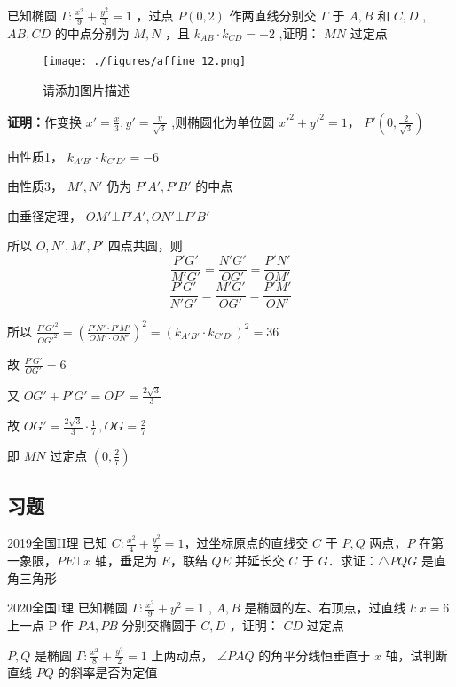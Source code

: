 \begin{example}{}
 已知椭圆 $\displaystyle{\Gamma:\frac{x^2}{9}+\frac{y^2}{3}=1}$ ，过点 $\displaystyle{P(0,2)}$ 作两直线分别交 $\displaystyle{\Gamma}$ 于 $\displaystyle{A,B}$ 和 $\displaystyle{C,D}$ , $\displaystyle{AB,CD}$ 的中点分别为 $\displaystyle{M,N}$ ，且 $\displaystyle{k_{AB}\cdot k_{CD}=-2}$ ,证明： $\displaystyle{MN}$ 过定点
\begin{figure}[ht]
\centering
\texttt{[image: ./figures/affine\_12.png]}
\caption{请添加图片描述} \label{affine_fig12}
\end{figure}
\textbf{证明：}作变换 $\displaystyle{x'=\frac{x}{3},y'=\frac{y}{\sqrt{3}}}$ ,则椭圆化为单位圆 $\displaystyle{x'^2+y'^2=1}$， $\displaystyle{P'\left(0,\frac{2}{\sqrt{3}}\right)}$

由性质1， $\displaystyle{k_{A'B'}\cdot k_{C'D'}=-6}$

由性质3， $\displaystyle{M',N'}$ 仍为 $\displaystyle{P'A',P'B'}$ 的中点

由垂径定理， $\displaystyle{OM'\bot P'A',ON'\bot P'B'}$

所以 $\displaystyle{O,N',M',P'}$ 四点共圆，则 
$$\frac{P'G'}{M'G'}=\frac{N'G'}{OG'}=\frac{P'N'}{OM'}$$
$$\frac{P'G'}{N'G'}=\frac{M'G'}{OG'}=\frac{P'M'}{ON'}$$

所以 $\displaystyle{\frac{P'G'^2}{OG'^2}=\left(\frac{P'N'\cdot P'M'}{OM'\cdot ON'}\right)^2=\left(k_{A'B'}\cdot k_{C'D'}\right)^2=36}$ 

故 $\displaystyle{\frac{P'G'}{OG'}=6}$ 

又 $\displaystyle{OG'+P'G'=OP'=\frac{2\sqrt{3}}{3}}$ 

故 $\displaystyle{OG'=\frac{2\sqrt{3}}{3}\cdot\frac{1}{7}\,,OG=\frac{2}{7}}$ 

即 $\displaystyle{MN}$ 过定点 $\displaystyle{\left(0,\frac{2}{7}\right)}$ 
\end{example}
\subsection{习题}
\begin{exercise}{2019全国II理}
已知 $\displaystyle{C:\frac{x^2}4+\frac{y^2}2=1}$，过坐标原点的直线交 $\displaystyle{C}$ 于 $\displaystyle{P,Q}$ 两点，$\displaystyle{P}$ 在第一象限，$\displaystyle{PE\bot x}$ 轴，垂足为 $\displaystyle{E}$，联结 $\displaystyle{QE}$ 并延长交 $\displaystyle{C}$ 于 $\displaystyle{G}$．求证：$\displaystyle{\triangle PQG}$ 是直角三角形
\end{exercise}
\begin{exercise}{2020全国I理}
已知椭圆 $\displaystyle{\Gamma:\frac{x^2}{9}+y^2=1}$ , $\displaystyle{A,B}$ 是椭圆的左、右顶点，过直线 $\displaystyle{l:x=6}$ 上一点 P 作 $\displaystyle{PA,PB}$ 分别交椭圆于 $\displaystyle{C,D}$ ，证明： $\displaystyle{CD}$ 过定点
\end{exercise}

\begin{exercise}{}
 $\displaystyle{P,Q}$ 是椭圆 $\displaystyle{\Gamma:\frac{x^2}{8}+\frac{y^2}{2}=1}$ 上两动点， $\displaystyle{\angle PAQ}$ 的角平分线恒垂直于 $\displaystyle{x}$ 轴，试判断直线 $\displaystyle{PQ}$ 的斜率是否为定值
\end{exercise}
